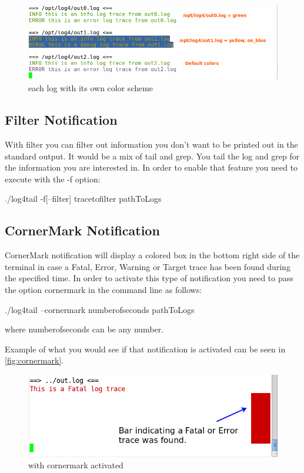 \begin{figure}[ht]
\centering
\includegraphics[scale=0.60]{multiple_colors.png}
\caption{\logftailer{} each log with its own color scheme}\label{fig:multiple_colors}
\end{figure}

\subsection{Filter Notification}
\label{sec:filter}
With filter you can filter out information you don't want to be printed out 
in the standard output. It would be a mix of tail and grep. You tail the log 
and grep for the information you are interested in. In order to enable that 
feature you need to execute \logftailer{} with the -f option:

\begin{cmd}
  ./log4tail -f[--filter] tracetofilter pathToLogs
\end{cmd}

\subsection{CornerMark Notification}
\label{sec:cornermark}
CornerMark notification will display a colored box in the bottom right side of
the terminal in case a Fatal, Error, Warning or Target trace has been found during the specified
time. In order to activate this type of notification you need to pass the
option cornermark in the command line as follows:

\begin{cmd}
  ./log4tail --cornermark numberofseconds pathToLogs
\end{cmd}
where numberofseconds can be any number. 

Example of what you would see if that notification is activated can be seen in
 \autoref{fig:cornermark}.

\begin{figure}[ht]
\centering
\includegraphics[scale=0.60]{terminalcornermark.png}
\caption{\logftailer{} with cornermark activated}\label{fig:cornermark}
\end{figure}

